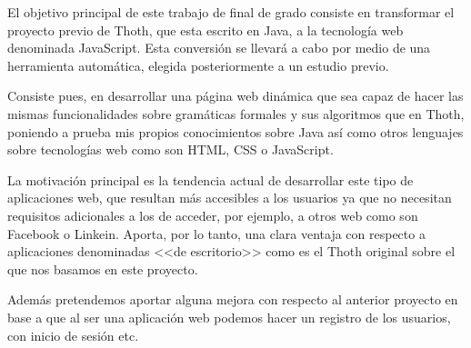 
El objetivo principal de este trabajo de final de grado consiste en transformar el proyecto previo de Thoth, que esta escrito en Java, a la tecnología web denominada JavaScript. Esta conversión se llevará a cabo por medio de una herramienta automática, elegida posteriormente a un estudio previo. 

Consiste pues, en desarrollar una página web dinámica que sea capaz de hacer las mismas funcionalidades sobre gramáticas formales y sus algoritmos que en Thoth, poniendo a prueba mis propios conocimientos sobre Java así como otros lenguajes sobre tecnologías web como son HTML, CSS o JavaScript.

La motivación principal es la tendencia actual de desarrollar este tipo de aplicaciones web, que resultan más accesibles a los usuarios ya que no necesitan requisitos adicionales a los de acceder, por ejemplo, a otros web como son Facebook o Linkein. Aporta, por lo tanto, una clara ventaja con respecto a aplicaciones denominadas <<de escritorio>> como es el Thoth original sobre el que nos basamos en este proyecto.

Además pretendemos aportar alguna mejora con respecto al anterior proyecto en base a que al ser una aplicación web podemos hacer un registro de los usuarios, con inicio de sesión etc.